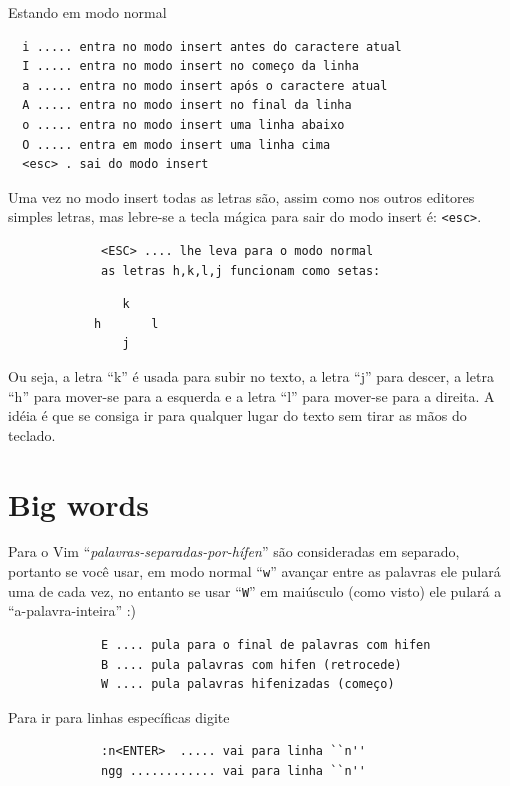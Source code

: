 \documentclass[10pt,a4paper,openany]{book}
\begin{document}
Estando em modo normal

\begin{verbatim}
  i ..... entra no modo insert antes do caractere atual
  I ..... entra no modo insert no começo da linha
  a ..... entra no modo insert após o caractere atual
  A ..... entra no modo insert no final da linha
  o ..... entra no modo insert uma linha abaixo
  O ..... entra em modo insert uma linha cima
  <esc> . sai do modo insert
\end{verbatim}

Uma vez no modo insert todas as letras são, assim como nos outros
editores simples letras, mas lebre-se a tecla mágica para sair do modo
insert é: \verb+<esc>+.

\begin{verbatim}
			 <ESC> .... lhe leva para o modo normal
			 as letras h,k,l,j funcionam como setas:
\end{verbatim}

\begin{verbatim}
				k
			h		l
				j
\end{verbatim}

Ou seja, a letra ``k'' é usada para subir no texto, a letra ``j'' para
descer, a letra ``h'' para mover-se para a esquerda e a letra ``l''
para mover-se para a direita. A idéia é que se consiga ir para
qualquer lugar do texto sem tirar as mãos do teclado.



\section{Big words}
\label{Big word's}

Para o Vim ``{\em{palavras-separadas-por-hífen}}'' são consideradas em separado, portanto se você usar,
em modo normal ``\verb+w+'' avançar entre as palavras ele pulará uma de
cada vez, no entanto se usar ``\verb+W+''
em maiúsculo (como visto) ele pulará a ``a-palavra-inteira'' :)

\begin{verbatim}
			 E .... pula para o final de palavras com hifen
			 B .... pula palavras com hifen (retrocede)
			 W .... pula palavras hifenizadas (começo)
\end{verbatim}



Para ir para linhas específicas digite

\begin{verbatim}
			 :n<ENTER>  ..... vai para linha ``n''
			 ngg ............ vai para linha ``n''
\end{verbatim}
\end{document}
